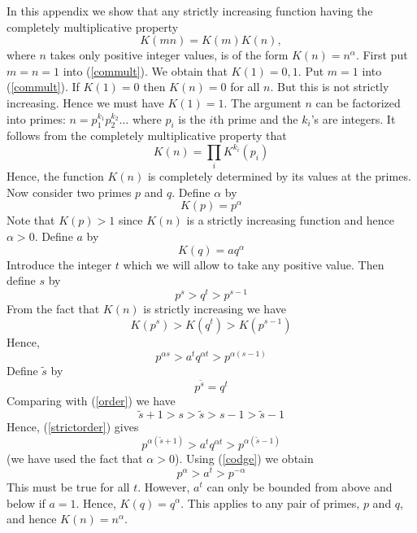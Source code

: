 \documentclass[12pt]{article}
\begin{document}
In this appendix we show that any strictly increasing function having
the completely multiplicative property
\begin{equation}\label{commult}
K(mn)=K(m)K(n),
\end{equation}
where $n$ takes only positive integer values,
is of the form $K(n)=n^\alpha$.  First put $m=n=1$ into
(\ref{commult}). We obtain that $K(1)=0,1$. Put $m=1$ into
(\ref{commult}). If $K(1)=0$ then $K(n)=0$ for all $n$. But this is not
strictly increasing.  Hence we must have $K(1)=1$. The argument $n$ can
be factorized into primes: $n=p_1^{k_1}p_2^{k_2}\dots$ where $p_i$ is
the $i$th prime and the $k_i$'s are integers. It follows from the
completely multiplicative property that
\begin{equation}
K(n)=\prod_i K^{k_i}(p_i)
\end{equation}
Hence, the function $K(n)$ is completely determined by its values at the
primes.  Now consider two primes $p$ and $q$.  Define $\alpha$ by
\begin{equation}
K(p)=p^\alpha
\end{equation}
Note that $K(p)>1$ since $K(n)$ is a strictly increasing function and
hence $\alpha>0$.
Define $a$ by
\begin{equation}
K(q)=aq^\alpha
\end{equation}
Introduce the integer $t$ which we will allow to take any positive
value. Then define $s$ by
\begin{equation}\label{order}
p^s> q^t > p^{s-1}
\end{equation}
From the fact that $K(n)$ is strictly increasing we have
\begin{equation}
K(p^s)> K(q^t) > K(p^{s-1})
\end{equation}
Hence,
\begin{equation}\label{strictorder}
p^{\alpha s} > a^t q^{\alpha t} > p^{\alpha (s-1)}
\end{equation}
Define $\widetilde{s}$ by
\begin{equation}\label{codge}
p^{\widetilde{s}} = q^t
\end{equation}
Comparing with (\ref{order}) we have
\begin{equation}
\widetilde{s}+1 > s>\widetilde{s}> s-1>\widetilde{s}-1
\end{equation}
Hence, (\ref{strictorder}) gives
\begin{equation}
p^{\alpha (\widetilde{s}+1)} > a^t q^{\alpha t} >
p^{\alpha (\widetilde{s}-1)}
\end{equation}
(we have used the fact that $\alpha>0$).
Using (\ref{codge}) we obtain
\begin{equation}
p^\alpha > a^t > p^{-\alpha}
\end{equation}
This must be true for all $t$.  However, $a^t$ can only be bounded from
above and below if $a=1$.  Hence, $K(q)=q^\alpha$.  This applies to any
pair of primes, $p$ and $q$, and hence $K(n)=n^\alpha$.
\end{document}
